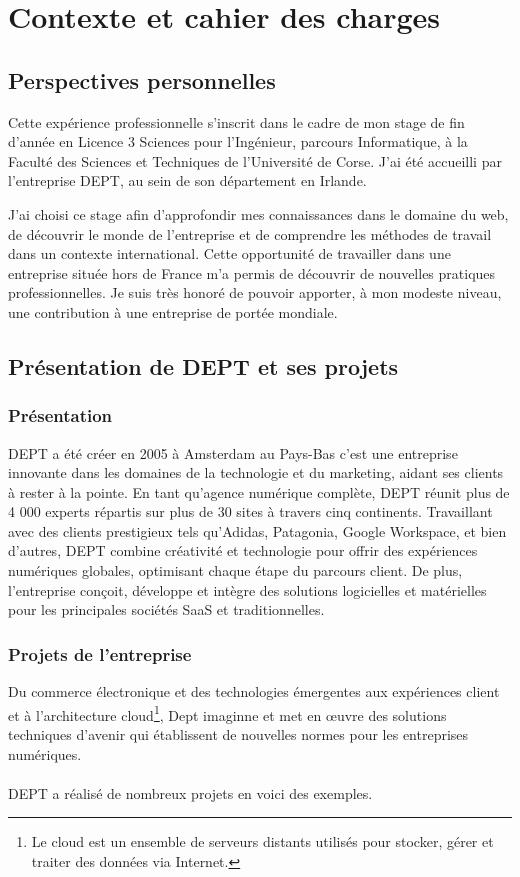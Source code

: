 \chapter{Contexte et cahier des charges}


\section{Perspectives personnelles}
Cette expérience professionnelle s'inscrit dans le cadre de mon stage de fin d'année en Licence 3 Sciences pour l'Ingénieur, parcours Informatique, à la Faculté des Sciences et Techniques de l'Université de Corse. J'ai été accueilli par l'entreprise DEPT, au sein de son département en Irlande.

J'ai choisi ce stage afin d'approfondir mes connaissances dans le domaine du web, de découvrir le monde de l'entreprise et de comprendre les méthodes de travail dans un contexte international. Cette opportunité de travailler dans une entreprise située hors de France m'a permis de découvrir de nouvelles pratiques professionnelles. Je suis très honoré de pouvoir apporter, à mon modeste niveau, une contribution à une entreprise de portée mondiale.


\section{Présentation de DEPT et ses projets}
\subsection{Présentation}
DEPT a été créer en 2005 à Amsterdam au Pays-Bas c'est une entreprise innovante dans les domaines de la technologie et du marketing, aidant ses clients à rester à la pointe. En tant qu'agence numérique complète, DEPT réunit plus de 4 000 experts répartis sur plus de 30 sites à travers cinq continents. Travaillant avec des clients prestigieux tels qu'Adidas, Patagonia, Google Workspace, et bien d'autres, DEPT combine créativité et technologie pour offrir des expériences numériques globales, optimisant chaque étape du parcours client. De plus, l'entreprise conçoit, développe et intègre des solutions logicielles et matérielles pour les principales sociétés SaaS et traditionnelles.

\subsection{Projets de l'entreprise}
Du commerce électronique et des technologies émergentes aux expériences client et à l'architecture cloud\footnote{Le cloud est un ensemble de serveurs distants utilisés pour stocker, gérer et traiter des données via Internet.}, Dept imaginne et met en œuvre des solutions techniques d'avenir qui établissent de nouvelles normes pour les entreprises numériques.
\\ \\
DEPT a réalisé de nombreux projets en voici des exemples.


